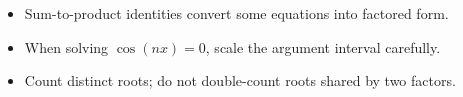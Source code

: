 \begin{takeaways}
\begin{itemize}[leftmargin=*]
  \item Sum-to-product identities convert some equations into factored form.
  \item When solving $\cos(nx)=0$, scale the argument interval carefully.
  \item Count distinct roots; do not double-count roots shared by two factors.
\end{itemize}
\end{takeaways}
